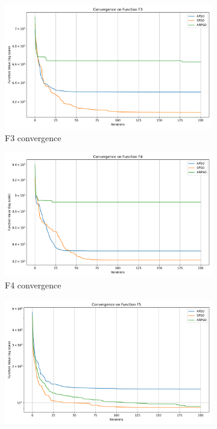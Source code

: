 \documentclass[aspectratio=169]{beamer}
\begin{document}
\begin{frame}
\begin{figure}
        \hfill
        \begin{subfigure}[b]{0.19\textwidth}
            \includegraphics[width=\textwidth]{../plots/cec_bench/cec_convergence_f3.png}
            \caption*{F3 convergence}
        \end{subfigure}
        \hfill
        \begin{subfigure}[b]{0.19\textwidth}
            \includegraphics[width=\textwidth]{../plots/cec_bench/cec_convergence_f4.png}
            \caption*{F4 convergence}
        \end{subfigure}
        \hfill
        \begin{subfigure}[b]{0.19\textwidth}
            \includegraphics[width=\textwidth]{../plots/cec_bench/cec_convergence_f5.png}

\end{subfigure}
\end{figure}
\end{frame}
\end{document}
